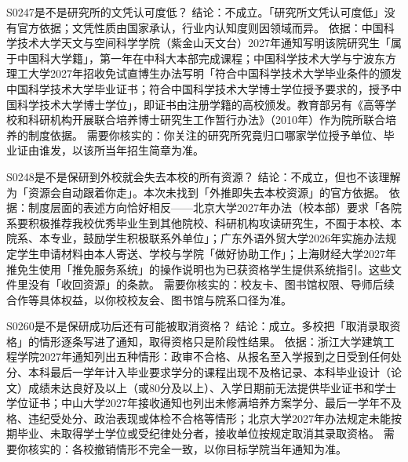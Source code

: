 \begin{qa}{S0247}{是不是研究所的文凭认可度低？}
结论：不成立。「研究所文凭认可度低」没有官方依据；文凭性质由国家承认，行业内认知度则因领域而异。
依据：中国科学技术大学天文与空间科学学院（紫金山天文台）2027年通知写明该院研究生「属于中国科大学籍」，第一年在中科大本部完成课程；中国科学技术大学与宁波东方理工大学2027年招收免试直博生办法写明「符合中国科学技术大学毕业条件的颁发中国科学技术大学毕业证书；符合中国科学技术大学博士学位授予要求的，授予中国科学技术大学博士学位」，即证书由注册学籍的高校颁发。教育部另有《高等学校和科研机构开展联合培养博士研究生工作暂行办法》（2010年）作为院所联合培养的制度依据。
需要你核实的：你关注的研究所究竟归口哪家学位授予单位、毕业证由谁发，以该所当年招生简章为准。
\end{qa}

\begin{qa}{S0248}{是不是保研到外校就会失去本校的所有资源？}
结论：不成立，但也不该理解为「资源会自动跟着你走」。本次未找到「外推即失去本校资源」的官方依据。
依据：制度层面的表述方向恰好相反——北京大学2027年办法（校本部）要求「各院系要积极推荐我校优秀毕业生到其他院校、科研机构攻读研究生，不囿于本校、本院系、本专业，鼓励学生积极联系外单位」；广东外语外贸大学2026年实施办法规定学生申请材料由本人寄送、学校与学院「做好协助工作」；上海财经大学2027年推免生使用「推免服务系统」的操作说明也为已获资格学生提供系统指引。这些文件里没有「收回资源」的条款。
需要你核实的：校友卡、图书馆权限、导师后续合作等具体权益，以你校校友会、图书馆与院系口径为准。
\end{qa}

\begin{qa}{S0260}{是不是保研成功后还有可能被取消资格？}
结论：成立。多校把「取消录取资格」的情形逐条写进了通知，取得资格只是阶段性结果。
依据：浙江大学建筑工程学院2027年通知列出五种情形：政审不合格、从报名至入学报到之日受到任何处分、本科最后一学年计入毕业要求学分的课程出现不及格记录、本科毕业设计（论文）成绩未达良好及以上（或80分及以上）、入学日期前无法提供毕业证书和学士学位证书；中山大学2027年接收通知也列出未修满培养方案学分、最后一学年不及格、违纪受处分、政治表现或体检不合格等情形；北京大学2027年办法规定未能按期毕业、未取得学士学位或受纪律处分者，接收单位按规定取消其录取资格。
需要你核实的：各校撤销情形不完全一致，以你目标学院当年通知为准。
\end{qa}

